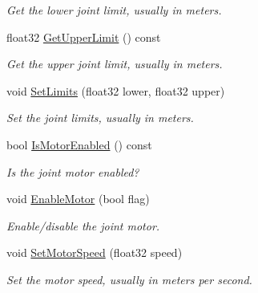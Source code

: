 \begin{DoxyCompactItemize}
\begin{DoxyCompactList}\small\item\em Get the lower joint limit, usually in meters. \end{DoxyCompactList}\item 
\mbox{\label{classb2PrismaticJoint_aabae1da55e500b9c77007de4d085ffda}} 
float32 \hyperlink{classb2PrismaticJoint_aabae1da55e500b9c77007de4d085ffda}{Get\+Upper\+Limit} () const
\begin{DoxyCompactList}\small\item\em Get the upper joint limit, usually in meters. \end{DoxyCompactList}\item 
\mbox{\label{classb2PrismaticJoint_a82a220e6d5a212c1924882e0855b0bef}} 
void \hyperlink{classb2PrismaticJoint_a82a220e6d5a212c1924882e0855b0bef}{Set\+Limits} (float32 lower, float32 upper)
\begin{DoxyCompactList}\small\item\em Set the joint limits, usually in meters. \end{DoxyCompactList}\item 
\mbox{\label{classb2PrismaticJoint_a06492dabf33439efdebceb29899c7fc9}} 
bool \hyperlink{classb2PrismaticJoint_a06492dabf33439efdebceb29899c7fc9}{Is\+Motor\+Enabled} () const
\begin{DoxyCompactList}\small\item\em Is the joint motor enabled? \end{DoxyCompactList}\item 
\mbox{\label{classb2PrismaticJoint_a4a7fd079de49f7ed5aa4a5d8d90be2a2}} 
void \hyperlink{classb2PrismaticJoint_a4a7fd079de49f7ed5aa4a5d8d90be2a2}{Enable\+Motor} (bool flag)
\begin{DoxyCompactList}\small\item\em Enable/disable the joint motor. \end{DoxyCompactList}\item 
\mbox{\label{classb2PrismaticJoint_a602ef7a6ca4fca55d011f1b38ab5a6c3}} 
void \hyperlink{classb2PrismaticJoint_a602ef7a6ca4fca55d011f1b38ab5a6c3}{Set\+Motor\+Speed} (float32 speed)
\begin{DoxyCompactList}\small\item\em Set the motor speed, usually in meters per second. \end{DoxyCompactList}\item 

\end{DoxyCompactItemize}
